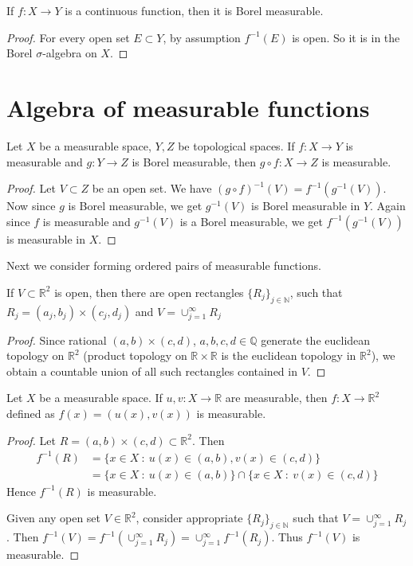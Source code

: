 \begin{proposition}
  If $f: X \to Y$ is a continuous function, then it is Borel measurable.
\end{proposition}
\begin{proof}
  For every open set $E \subset Y$, by assumption $f^{-1}(E)$ is open. So it is in the Borel $\sigma$-algebra on $X$.
\end{proof}
\section{Algebra of measurable functions}

\begin{theorem}
  Let $X$ be a measurable space, $Y, Z$ be topological spaces. If $f: X \to Y$ is measurable and $g: Y \to Z$ is Borel measurable, then $g\circ f: X \to Z$ is measurable.
\end{theorem}
\begin{proof}
  Let $V \subset Z$ be an open set. We have $(g \circ f)^{-1}(V) = f^{-1}(g^{-1}(V))$. Now since $g$ is Borel measurable, we get $g^{-1}(V)$ is Borel measurable in $Y$. Again since $f$ is measurable and $g^{-1}(V)$ is a Borel measurable, we get $f^{-1}(g^{-1}(V))$ is measurable in $X$.
\end{proof}
Next we consider forming ordered pairs of measurable functions.

\begin{lemma}
  If $V \subset \mathbb{R}^2$ is open, then there are open rectangles $\{ R_j \}_{j \in \mathbb{N}}$, such that $R_j = (a_j, b_j)\times (c_j, d_j)$ and $V = \cup_{j = 1}^{\infty}R_j$
\end{lemma}
\begin{proof}
  Since rational $(a, b) \times (c, d)$, $a, b, c, d \in \mathbb{Q}$ generate the euclidean topology on $\mathbb{R}^2$ (product topology on $\mathbb{R} \times \mathbb{R}$ is the euclidean topology in $\mathbb{R}^2$), we obtain a countable union of all such rectangles contained in $V$.
\end{proof}

\begin{theorem}
  \label{thm:product_measurable_functions}
  Let $X$ be a measurable space. If $u, v :X \to \mathbb{R}$ are measurable, then $f: X \to \mathbb{R}^2$ defined as $f(x) = (u(x), v(x))$ is measurable.
\end{theorem}
\begin{proof}
  Let $R = (a, b) \times (c, d) \subset \mathbb{R}^2$. Then \begin{align*}
    f^{-1}(R) &= \{ x \in X \ : \ u(x) \in (a, b), v(x) \in ( c, d) \} \\ 
    &= \{ x \in X \ : \ u(x) \in (a, b) \} \cap \{  x \in X  \ : \  v(x) \in (c, d) \}
  \end{align*}
  Hence $f^{-1}(R)$ is measurable.

  Given any open set $V \in \mathbb{R}^2$, consider appropriate $\{ R_j \}_{j \in \mathbb{N}}$ such that $V = \cup_{j = 1}^{\infty}R_j$. Then $f^{-1}(V) = f^{-1}(\cup_{j = 1}^{\infty}R_j) = \cup_{ j = 1}^{\infty}f^{-1}(R_j)$. Thus $f^{-1}(V)$ is measurable.
\end{proof}


